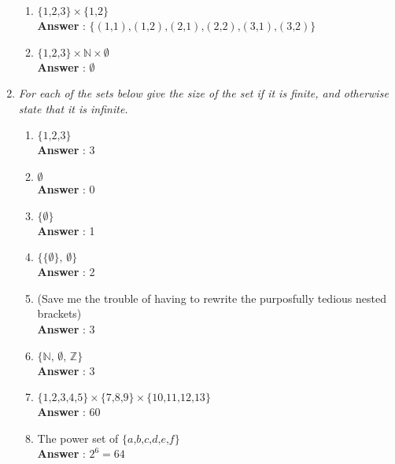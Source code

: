 \documentclass[a4paper,11pt]{article}
\begin{document}
\begin{enumerate}
\begin{enumerate}
  \item \( \lbrace 1 \text{,} 2 \text{,} 3 \rbrace \times \lbrace 1 \text{,} 2 \rbrace  \) \\
  \textbf{Answer} : \( \lbrace
  (1 \text{,} 1) \text{,} 
  (1 \text{,} 2) \text{,} 
  (2 \text{,} 1) \text{,} 
  (2 \text{,} 2) \text{,} 
  (3 \text{,} 1) \text{,} 
  (3 \text{,} 2) 
   \rbrace \)


   \item \( \lbrace 1 \text{,} 2 \text{,} 3 \rbrace \times \mathbb{N} \times \emptyset \) \\
   \textbf{Answer} : \( \emptyset \)

  \end{enumerate}

\item \emph{For each of the sets below give the size of the set if it is finite, and otherwise state that it
is infinite.}
  
  \begin{enumerate}

  \item \( \lbrace 1 \text{,} 2 \text{,} 3 \rbrace \) \\
  \textbf{Answer} : 3
  \item \( \emptyset \)\\
  \textbf{Answer} : 0
  \item \( \lbrace \emptyset \rbrace \) \\
  \textbf{Answer} : 1
  \item \( \lbrace \lbrace \emptyset \rbrace \text{, } \emptyset \rbrace \) \\
  \textbf{Answer} : 2
  \item (Save me the trouble of having to rewrite the purposfully tedious nested brackets) \\
  \textbf{Answer} : 3
  \item \( \lbrace \mathbb{N} \text{, } \emptyset \text{, } \mathbb{Z} \rbrace \) \\
  \textbf{Answer} : 3
  \item \( \lbrace 1 \text{,} 2 \text{,} 3 \text{,} 4 \text{,} 5 \rbrace \times \lbrace 7 \text{,} 8 \text{,} 9 \rbrace \times \lbrace 10 \text{,} 11 \text{,} 12 \text{,} 13 \rbrace  \) \\
  \textbf{Answer} : 60
  \item The power set of \( \lbrace a \text{,} b \text{,} c \text{,} d \text{,} e \text{,} f \rbrace \) \\
  \textbf{Answer} : $2^6 = 64$


\end{enumerate}
\end{enumerate}
\end{document}

